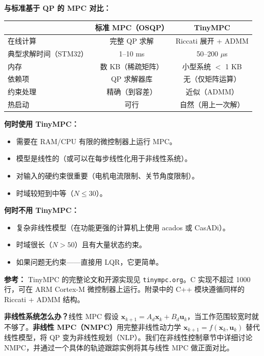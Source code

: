 \textbf{与标准基于 QP 的 MPC 对比：}

\begin{center}
\begin{tabular}{lcc}
\toprule
 & \textbf{标准 MPC（OSQP）} & \textbf{TinyMPC} \\
\midrule
在线计算 & 完整 QP 求解 & Riccati 展开 + ADMM \\
典型求解时间（STM32） & 1--10 ms & 50--200 $\mu$s \\
内存 & 数 KB（稀疏矩阵） & 小型系统 $<$ 1 KB \\
依赖项 & QP 求解器库 & 无（仅矩阵运算） \\
约束处理 & 精确（到容差） & 近似（ADMM） \\
热启动 & 可行 & 自然（用上一次解） \\
\bottomrule
\end{tabular}
\end{center}

\textbf{何时使用 TinyMPC：}
\begin{itemize}
    \item 需要在 RAM/CPU 有限的微控制器上运行 MPC。
    \item 模型是线性的（或可以在每步线性化用于非线性系统）。
    \item 对输入的硬约束很重要（电机电流限制、关节角度限制）。
    \item 时域较短到中等（$N \leq 30$）。
\end{itemize}

\textbf{何时不用 TinyMPC：}
\begin{itemize}
    \item 复杂非线性模型（在功能更强的计算机上使用 acados 或 CasADi）。
    \item 时域很长（$N > 50$）且有大量状态约束。
    \item 如果问题无约束——直接用 LQR，它更简单。
\end{itemize}

\textbf{参考：} TinyMPC 的完整论文和开源实现见 \texttt{tinympc.org}。C 实现不超过 1000 行，可在 ARM Cortex-M 微控制器上运行。附录中的 C++ 模块遵循同样的 Riccati + ADMM 结构。

\textbf{非线性系统怎么办？}线性 MPC 假设 $\mathbf{x}_{k+1} = A_d \mathbf{x}_k + B_d \mathbf{u}_k$，当工作范围较宽时就不够了。\textbf{非线性 MPC（NMPC）}用完整非线性动力学 $\mathbf{x}_{k+1} = f(\mathbf{x}_k, \mathbf{u}_k)$ 替代线性模型，将 QP 变为非线性规划（NLP）。我们在非线性控制章节中详细讨论 NMPC，并通过一个具体的轨迹跟踪实例将其与线性 MPC 做正面对比。

